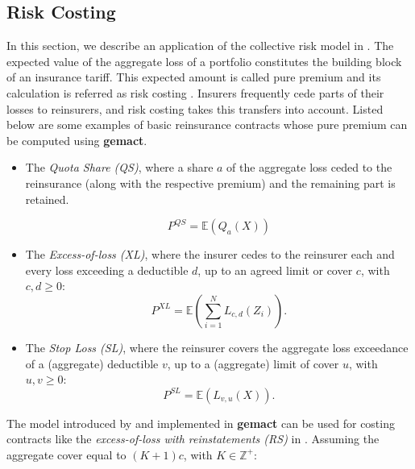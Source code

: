 \documentclass{article}
\begin{document}
\subsection{Risk Costing}

In this section, we describe an application of the collective risk model in . The expected value of the aggregate loss of a portfolio constitutes the building block of an insurance tariff. This expected amount is called pure premium and its calculation is referred as risk costing \cite[p.~282]{parodi14}. Insurers frequently cede parts of their losses to reinsurers, and risk costing takes this transfers into account. Listed below are some examples of basic reinsurance contracts whose pure premium can be computed using \textbf{gemact}.

\begin{itemize}
    \item The \textit{Quota Share (QS)}, where a share $a$ of the aggregate loss ceded to the reinsurance (along with the respective premium) and the remaining part is retained.
    
    \begin{equation}
        P^{QS} = \mathbb{E}\left( Q_a \left( X \right)\right)
    \end{equation}
    
    \item The \textit{Excess-of-loss (XL)}, where the insurer cedes to the reinsurer each and every loss exceeding a deductible $d$, up to an agreed limit or cover $c$, with $c,d \geq 0$: 
    \begin{equation}
        P^{XL} =  \mathbb{E}\left( \sum_{i=1}^{N} L_{c,d} (Z_i) \right).
    \end{equation}
    
\item The \textit{Stop Loss (SL)}, where the reinsurer covers the aggregate loss exceedance of a (aggregate) deductible $v$, up to a (aggregate) limit of cover $u$, with $u,v \geq 0$:
    \begin{equation}
    \label{eq:sl}
        P^{SL} = \mathbb{E}\left( L_{v, u} (X) \right).
    \end{equation} 
\end{itemize}

The model introduced by  and implemented in \textbf{gemact} can be used for costing contracts like the \textit{excess-of-loss with reinstatements (RS)} in \cite{Sundt93}. Assuming the aggregate cover equal to $ (K + 1) c $, with $K \in \mathbb{Z}^+$:
\end{document}
